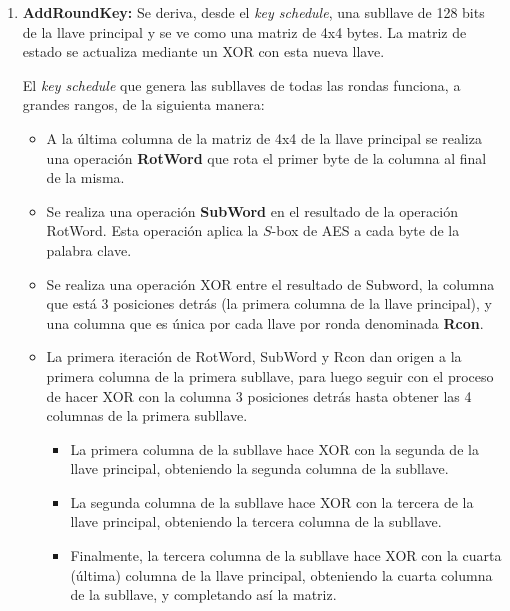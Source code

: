 \begin{enumerate}
    \item \textbf{AddRoundKey:} Se deriva, desde el \textit{key schedule}, una subllave de 128 bits de la llave principal y se ve como una matriz de 4x4 bytes. La matriz de estado se actualiza mediante un XOR con esta nueva llave.

    El \textit{key schedule} que genera las subllaves de todas las rondas funciona, a grandes rangos, de la siguienta manera:
    \begin{itemize}
        \item A la última columna de la matriz de 4x4 de la llave principal se realiza una operación \textbf{RotWord} que rota el primer byte de la columna al final de la misma.

        \item Se realiza una operación \textbf{SubWord} en el resultado de la operación RotWord. Esta operación aplica la $S$-box de AES a cada byte de la palabra clave.
        
        \item Se realiza una operación XOR entre el resultado de Subword, la columna que está 3 posiciones detrás (la primera columna de la llave principal), y una columna que es única por cada llave por ronda denominada \textbf{Rcon}.

        \item La primera iteración de RotWord, SubWord y Rcon dan origen a la primera columna de la primera subllave, para luego seguir con el proceso de hacer XOR con la columna 3 posiciones detrás hasta obtener las 4 columnas de la primera subllave.
        
        \begin{itemize}
            \item La primera columna de la subllave hace XOR con la segunda de la llave principal, obteniendo la segunda columna de la subllave.
            \item La segunda columna de la subllave hace XOR con la tercera de la llave principal, obteniendo la tercera columna de la subllave.
            \item Finalmente, la tercera columna de la subllave hace XOR con la cuarta (última) columna de la llave principal, obteniendo la cuarta columna de la subllave, y completando así la matriz.
        \end{itemize}
        

\end{itemize}
\end{enumerate}
